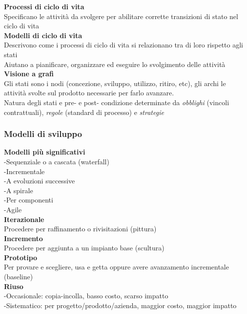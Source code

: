 \documentclass{article}
\begin{document}
		\textbf{Processi di ciclo di vita}\\
		Specificano le attività da svolgere per abilitare corrette transizioni di stato nel ciclo di vita\\
		
		
		\textbf{Modelli di ciclo di vita}\\
		Descrivono come i processi di ciclo di vita si relazionano tra di loro rispetto agli stati\\
		Aiutano a pianificare, organizzare ed eseguire lo svolgimento delle attività\\
		
		
		\textbf{Visione a grafi}\\
		Gli stati sono i nodi (concezione, sviluppo, utilizzo, ritiro, etc), gli archi le attività svolte sul prodotto necessarie per farlo avanzare.\\
		Natura degli stati e pre- e post- condizione determinate da \textit{obblighi} (vincoli contrattuali), \textit{regole} (standard di processo) e \textit{strategie}\\
		
		\subsubsection{Modelli di sviluppo}
			\textbf{Modelli più significativi}\\
			-Sequenziale o a cascata (waterfall)\\
			-Incrementale\\
			-A evoluzioni successive\\
			-A spirale\\
			-Per componenti\\
			-Agile\\
		
			
			\textbf{Iterazionale}\\
			Procedere per raffinamento o rivisitazioni (pittura)\\
			
			\textbf{Incremento}\\
			Procedere per aggiunta a un impianto base (scultura)\\
			
			\textbf{Prototipo}\\
			Per provare e scegliere, usa e getta oppure avere avanzamento incrementale (baseline)\\
			
			\textbf{Riuso}\\
			-Occasionale: copia-incolla, basso costo, scarso impatto\\
			-Sistematico: per progetto/prodotto/azienda, maggior costo, maggior impatto\\
			
\end{document}
